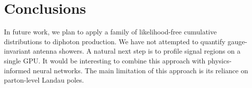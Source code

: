 \section{Conclusions}\label{sec:conclusions}

In future work, we plan to apply a family of likelihood-free cumulative
distributions to diphoton production. We have not attempted to quantify
gauge-invariant antenna showers. A natural next step is to profile
signal regions on a single GPU. It would be interesting to combine this
approach with physics-informed neural networks. The main limitation of
this approach is its reliance on parton-level Landau poles.

